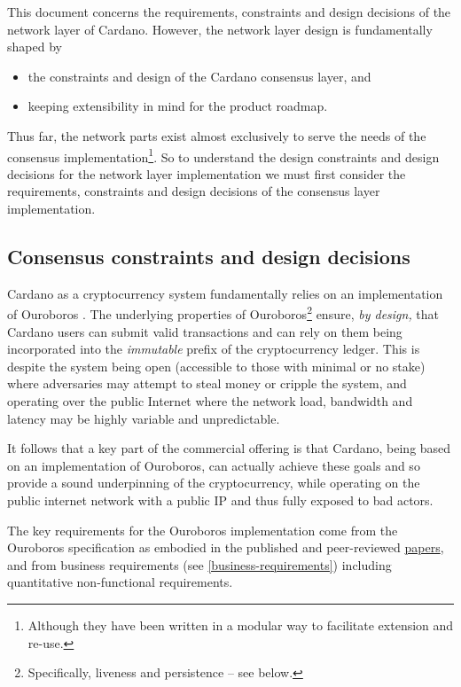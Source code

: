 \documentclass[11pt,a4paper]{article}
\begin{document}
This document concerns the requirements, constraints and design
decisions of the network layer of Cardano. However, the network layer
design is fundamentally shaped by

\begin{itemize}
\item
  the constraints and design of the Cardano consensus layer, and
\item
  keeping extensibility in mind for the product roadmap.
\end{itemize}

Thus far, the network parts exist almost exclusively to serve the needs
of the consensus implementation\footnote{Although they have been written
  in a modular way to facilitate extension and re-use.}. So to
understand the design constraints and design decisions for the network
layer implementation we must first consider the requirements,
constraints and design decisions of the consensus layer implementation.

\subsection{Consensus constraints and design decisions}
\label{consensus-constraints-and-design-decisions}

Cardano as a cryptocurrency system fundamentally relies on an
implementation of Ouroboros \cite{BGKR17, BGKRZ19}. The underlying
properties of Ouroboros\footnote{Specifically, liveness and persistence
  -- see below.} ensure, \emph{by design,} that Cardano users can submit
valid transactions and can rely on them being incorporated into the
\emph{immutable} prefix of the cryptocurrency ledger. This is despite
the system being open (accessible to those with minimal or no stake)
where adversaries may attempt to steal money or cripple the system, and
operating over the public Internet where the network load, bandwidth and
latency may be highly variable and unpredictable.

It follows that a key part of the commercial offering is that Cardano,
being based on an implementation of Ouroboros, can actually achieve
these goals and so provide a sound underpinning of the cryptocurrency,
while operating on the public internet network with a public IP and thus
fully exposed to bad actors.

The key requirements for the Ouroboros implementation come from the
Ouroboros specification as embodied in the published and peer-reviewed
\href{https://iohk.io/research/papers/}{{papers}}, and from business
requirements (see \cref{business-requirements})
including quantitative non-functional requirements.
\end{document}
